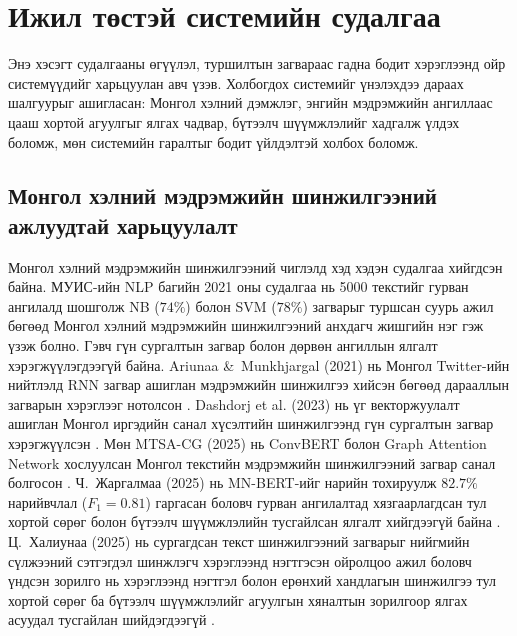 
\section{Ижил төстэй системийн судалгаа}

Энэ хэсэгт судалгааны өгүүлэл, туршилтын загвараас гадна бодит хэрэглээнд
ойр системүүдийг харьцуулан авч үзэв. Холбогдох системийг үнэлэхдээ
дараах шалгуурыг ашигласан: Монгол хэлний дэмжлэг, энгийн мэдрэмжийн
ангиллаас цааш хортой агуулгыг ялгах чадвар, бүтээлч шүүмжлэлийг хадгалж
үлдэх боломж, мөн системийн гаралтыг бодит үйлдэлтэй холбох боломж.

\subsection{Монгол хэлний мэдрэмжийн шинжилгээний ажлуудтай харьцуулалт}

Монгол хэлний мэдрэмжийн шинжилгээний чиглэлд хэд хэдэн судалгаа хийгдсэн
байна. МУИС-ийн NLP багийн 2021 оны судалгаа \cite{mnunlp2021} нь 5000 текстийг
гурван ангилалд шошголж NB ($74\%$) болон SVM ($78\%$) загварыг туршсан суурь
ажил бөгөөд Монгол хэлний мэдрэмжийн шинжилгээний анхдагч жишгийн нэг гэж
үзэж болно. Гэвч гүн сургалтын загвар болон дөрвөн ангиллын ялгалт
хэрэгжүүлэгдээгүй байна.
Ariunaa \&\ Munkhjargal (2021) нь Монгол Twitter-ийн нийтлэлд RNN загвар ашиглан
мэдрэмжийн шинжилгээ хийсэн бөгөөд дарааллын загварын хэрэглээг нотолсон
\cite{ariunaa2021}. Dashdorj et al. (2023) нь үг векторжуулалт ашиглан Монгол
иргэдийн санал хүсэлтийн шинжилгээнд гүн сургалтын загвар хэрэгжүүлсэн
\cite{dashdorj2023}. Мөн MTSA-CG (2025) нь ConvBERT болон Graph Attention Network
хослуулсан Монгол текстийн мэдрэмжийн шинжилгээний загвар санал болгосон
\cite{mtsacg2025}. Ч.~Жаргалмаа (2025) нь MN-BERT-ийг нарийн тохируулж
$82.7\%$ нарийвчлал ($F_1{=}0.81$) гаргасан боловч гурван ангилалтад
хязгаарлагдсан тул хортой сөрөг болон бүтээлч шүүмжлэлийн тусгайлсан ялгалт
хийгдээгүй байна \cite{jargalmaa2025}. Ц.~Халиунаа (2025) нь сургагдсан текст
шинжилгээний загварыг нийгмийн сүлжээний сэтгэгдэл шинжлэгч хэрэглээнд
нэгтгэсэн ойролцоо ажил боловч үндсэн зорилго нь хэрэглээнд нэгтгэл болон
ерөнхий хандлагын шинжилгээ тул хортой сөрөг ба бүтээлч шүүмжлэлийг агуулгын
хяналтын зорилгоор ялгах асуудал тусгайлан шийдэгдээгүй \cite{haliunaa2025}.

